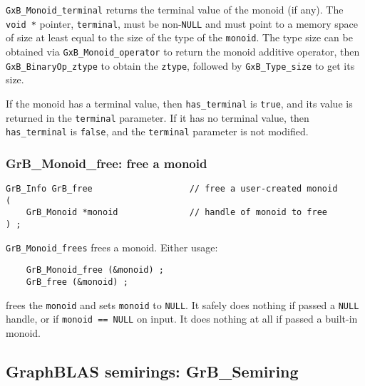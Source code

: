 \documentclass[12pt]{article}
\begin{document}
\verb'GxB_Monoid_terminal' returns the terminal value of the monoid (if any).
The \verb'void *' pointer, \verb'terminal', must be non-\verb'NULL' and must
point to a memory space of size at least equal to the size of the type of the
\verb'monoid'.  The type size can be obtained via \verb'GxB_Monoid_operator' to
return the monoid additive operator, then \verb'GxB_BinaryOp_ztype' to obtain
the \verb'ztype', followed by \verb'GxB_Type_size' to get its size.

If the monoid has a terminal value, then \verb'has_terminal' is \verb'true',
and its value is returned in the \verb'terminal' parameter.  If it has no
terminal value, then \verb'has_terminal' is \verb'false', and the
\verb'terminal' parameter is not modified.

\subsubsection{{\sf GrB\_Monoid\_free:} free a monoid}
\label{monoid_free}

\begin{mdframed}[userdefinedwidth=6in]
{\footnotesize
\begin{verbatim}
GrB_Info GrB_free                   // free a user-created monoid
(
    GrB_Monoid *monoid              // handle of monoid to free
) ;
\end{verbatim}
} \end{mdframed}

\verb'GrB_Monoid_frees' frees a monoid.  Either usage:

    {\small
    \begin{verbatim}
    GrB_Monoid_free (&monoid) ;
    GrB_free (&monoid) ; \end{verbatim}}

\noindent
frees the \verb'monoid' and sets \verb'monoid' to \verb'NULL'.  It safely does
nothing if passed a \verb'NULL' handle, or if \verb'monoid == NULL' on input.
It does nothing at all if passed a built-in monoid.

\newpage
\subsection{GraphBLAS semirings: {\sf GrB\_Semiring}} %
\label{semiring}
\end{document}
